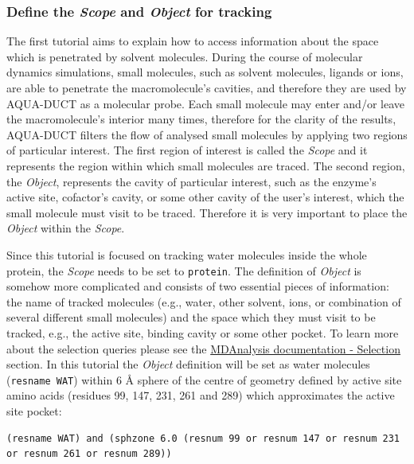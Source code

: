 \documentclass[9pt,tutorial, pubversion]{livecoms}
\begin{document}
\subsubsection{Define the \emph{Scope} and \emph{Object} for tracking}
The first tutorial aims to explain how to access information about the space which is penetrated by solvent molecules. During the course of molecular dynamics simulations, small molecules, such as solvent molecules, ligands or ions, are able to penetrate the macromolecule's cavities, and therefore they are used by AQUA-DUCT as a molecular probe. Each small molecule may enter and/or leave the macromolecule's interior many times, therefore for the clarity of the results, AQUA-DUCT filters the flow of analysed small molecules by applying two regions of particular interest. The first region of interest is called the \emph{Scope} and it represents the region within which small molecules are traced. The second region, the \emph{Object}, represents the cavity of particular interest, such as the enzyme's active site, cofactor's cavity, or some other cavity of the user's interest, which the small molecule must visit to be traced. Therefore it is very important to place the \emph{Object} within the \emph{Scope}. 

Since this tutorial is focused on tracking water molecules inside the whole protein, the \textit{Scope} needs to be set to \texttt{protein}. The  definition  of \textit{Object} is somehow more complicated and consists of two essential pieces of information: the name of tracked molecules (e.g., water, other solvent, ions, or combination of several different small molecules) and the space which they must visit to be tracked, e.g., the active site, binding cavity or some other pocket. To learn more about the selection queries please see the \href{https://www.mdanalysis.org/docs/documentation_pages/selections.html}{MDAnalysis documentation - Selection} section. In this tutorial the \emph{Object} definition will be set as water molecules (\texttt{resname WAT}) within 6 Å sphere of the centre of geometry defined by active site amino acids (residues 99, 147, 231, 261 and 289) which approximates the active site pocket:
\begin{lstlisting}
(resname WAT) and (sphzone 6.0 (resnum 99 or resnum 147 or resnum 231 or resnum 261 or resnum 289))
\end{lstlisting}
\end{document}
